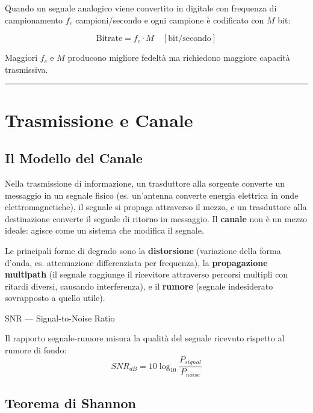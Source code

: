 \documentclass[
  italian,
  openany]{book}
\begin{document}
Quando un segnale analogico viene convertito in digitale con frequenza
di campionamento \(f_c\) campioni/secondo e ogni campione è codificato
con \(M\) bit:

\[\text{Bitrate} = f_c \cdot M \quad [\text{bit/secondo}]\]

Maggiori \(f_c\) e \(M\) producono migliore fedeltà ma richiedono
maggiore capacità trasmissiva.

\begin{center}\rule{0.5\linewidth}{0.5pt}\end{center}

\section{Trasmissione e Canale}\label{trasmissione-e-canale}

\subsection{Il Modello del Canale}\label{il-modello-del-canale}

Nella trasmissione di informazione, un trasduttore alla sorgente
converte un messaggio in un segnale fisico (es. un'antenna converte
energia elettrica in onde elettromagnetiche), il segnale si propaga
attraverso il mezzo, e un trasduttore alla destinazione converte il
segnale di ritorno in messaggio. Il \textbf{canale} non è un mezzo
ideale: agisce come un sistema che modifica il segnale.

Le principali forme di degrado sono la \textbf{distorsione} (variazione
della forma d'onda, es. attenuazione differenziata per frequenza), la
\textbf{propagazione multipath} (il segnale raggiunge il ricevitore
attraverso percorsi multipli con ritardi diversi, causando
interferenza), e il \textbf{rumore} (segnale indesiderato sovrapposto a
quello utile).

\begin{calloutdefinition}{SNR — Signal-to-Noise Ratio}

Il rapporto segnale-rumore misura la qualità del segnale ricevuto
rispetto al rumore di fondo:
\[SNR_{dB} = 10 \log_{10} \frac{P_{signal}}{P_{noise}}\]

\end{calloutdefinition}

\subsection{Teorema di Shannon}\label{teorema-di-shannon}
\end{document}
